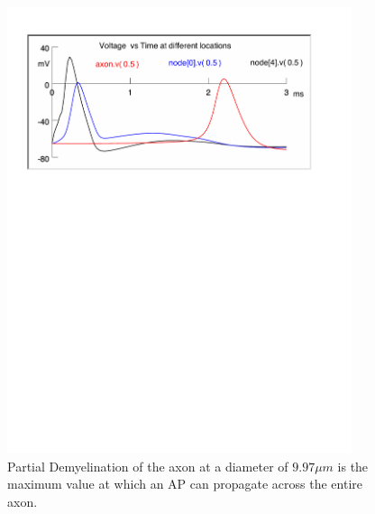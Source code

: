 \documentclass[12pt]{article}
\begin{document}
\begin{figure}[H]
\centering
\includegraphics[width=0.9\textwidth]{Results/4b-997}
\caption{\label{fig:P4b1} Partial Demyelination of the axon at a diameter of $9.97 \mu m$ is the maximum value at which an AP can propagate across the entire axon.}
\end{figure}
\end{document}
